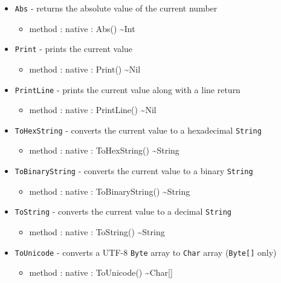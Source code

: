 \documentclass[11pt]{article}
\begin{document}
\begin{itemize}
\item \texttt{Abs} - returns the absolute value of the current number
  \begin{itemize}
  \item method : native : Abs() \textasciitilde Int
  \end{itemize}
\item \texttt{Print} - prints the current value
  \begin{itemize}
  \item method : native : Print() \textasciitilde Nil
  \end{itemize}
\item \texttt{PrintLine} - prints the current value along with a line
  return
  \begin{itemize}
  \item method : native : PrintLine() \textasciitilde Nil
  \end{itemize}
\item \texttt{ToHexString} - converts the current value to a hexadecimal
  \texttt{String}
  \begin{itemize}
  \item method : native : ToHexString() \textasciitilde String
  \end{itemize}
\item \texttt{ToBinaryString} - converts the current value to a binary
  \texttt{String}
  \begin{itemize}
  \item method : native : ToBinaryString() \textasciitilde String
  \end{itemize}
\item \texttt{ToString} - converts the current value to a decimal
  \texttt{String}
  \begin{itemize}
  \item method : native : ToString() \textasciitilde String
  \end{itemize}
\item \texttt{ToUnicode} - converts a UTF-8 \texttt{Byte} array to \texttt{Char} array (\texttt{Byte[]} only)
  \begin{itemize}
  \item method : native : ToUnicode() \textasciitilde Char[]
  \end{itemize}
\end{itemize}
\end{document}
